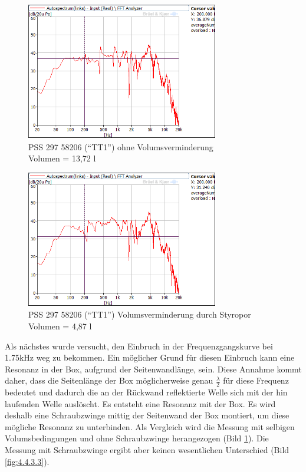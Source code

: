 \newpage
\begin{figure} [H]
	\centering
	\includegraphics[width=0.75\textwidth]{img/Optimierung/TT/TT1_ohneAllem.png}
	\caption{PSS 297 58206 (\enquote{TT1}) ohne Volumsverminderung \\Volumen = 13,72 l}
	\label{fig:4.4.3.1}
\end{figure}

\begin{figure} [H]
	\centering
	\includegraphics[width=0.75\textwidth]{img/Optimierung/TT/TT1_Styro_4-87l.png}
	\caption{PSS 297 58206 (\enquote{TT1}) Volumsverminderung durch Styropor \\Volumen = 4,87 l}
	\label{fig:4.4.3.2}
\end{figure}

\newpage
Als nächstes wurde versucht, den Einbruch in der Frequenzgangskurve bei 1.75kHz weg zu bekommen.
Ein möglicher Grund für diesen Einbruch kann eine Resonanz in der Box, aufgrund der Seitenwandlänge, sein.
Diese Annahme kommt daher, dass die Seitenlänge der Box möglicherweise genau $\frac{\lambda}{2}$ für diese Frequenz bedeutet und dadurch die an der Rückwand reflektierte Welle sich mit der hin laufenden Welle auslöscht.
Es entsteht eine Resonanz mit der Box.
Es wird deshalb eine Schraubzwinge mittig der Seitenwand der Box montiert, um diese mögliche Resonanz zu unterbinden.
Als Vergleich wird die Messung mit selbigen Volumsbedingungen und ohne Schraubzwinge herangezogen (Bild \ref{fig:4.4.3.1}).
Die Messung mit Schraubzwinge ergibt aber keinen wesentlichen Unterschied (Bild \ref{fig:4.4.3.3}).\\ \\

